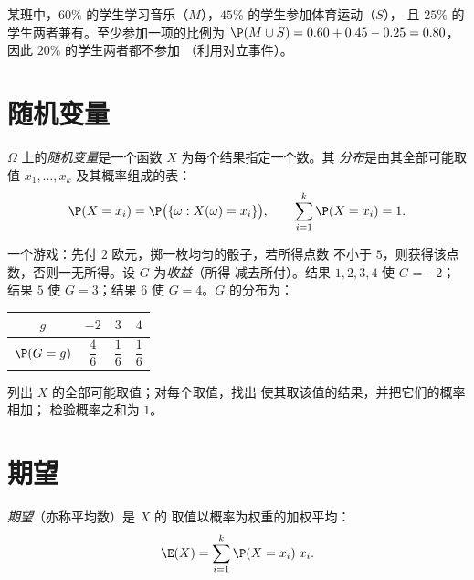 \begin{example}
某班中，$60\%$ 的学生学习音乐（$M$），$45\%$ 的学生参加体育运动（$S$），
且 $25\%$ 的学生两者兼有。至少参加一项的比例为
$\P(M \cup S) = 0.60 + 0.45 - 0.25 = 0.80$，因此 $20\%$ 的学生两者都不参加
（利用对立事件）。
\end{example}

\section{随机变量}

\begin{definition}[随机变量与分布]\label{def:g11:prob:rv}
$\Omega$ 上的\emph{随机变量}是一个函数
$X$ 为每个结果指定一个数。其
\emph{分布}是由其全部可能取值
$x_1, \dots, x_k$ 及其概率组成的表：
\[
\P(X = x_i) = \P\bigl(\{\omega : X(\omega) = x_i\}\bigr),
\qquad
\sum_{i=1}^k \P(X = x_i) = 1 .
\]
\end{definition}

\begin{example}\label{ex:g11:prob:game}
一个游戏：先付 $2$ 欧元，掷一枚均匀的骰子，若所得点数
不小于 $5$，则获得该点数，否则一无所得。设 $G$ 为\emph{收益}（所得
减去所付）。结果 $1, 2, 3, 4$ 使 $G = -2$；结果 $5$
使 $G = 3$；结果 $6$ 使 $G = 4$。$G$ 的分布为：
\begin{center}
\begin{tabular}{c|ccc}
$g$ & $-2$ & $3$ & $4$\\
\hline\rule{0pt}{11pt}%
$\P(G = g)$ & $\dfrac46$ & $\dfrac16$ & $\dfrac16$
\end{tabular}
\end{center}
\end{example}

\begin{method}[构造分布表]\label{met:g11:prob:table}
列出 $X$ 的全部可能取值；对每个取值，找出
使其取该值的结果，并把它们的概率相加；
检验概率之和为 $1$。
\end{method}

\section{期望}

\begin{definition}[期望]\label{def:g11:prob:expectation}
\emph{期望}（亦称平均数）是 $X$ 的
取值以概率为权重的加权平均：
\[
\E(X) = \sum_{i=1}^{k} \P(X = x_i)\; x_i .
\]
\end{definition}

